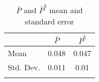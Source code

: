 \begin{table}[h!]
\centering
\caption{$\bar{P}$ and $\bar{P}^b$ mean and standard error}\label{tab:pb-comp}
\begin{tabular}{lcc}
 \hline 
 & $\bar{P}$ & $\bar{P}^b$ \\ 
\hline
Mean &0.048 & 0.047\\
Std. Dev. & 0.011&0.01\\\hline\\
\end{tabular}
\end{table}

